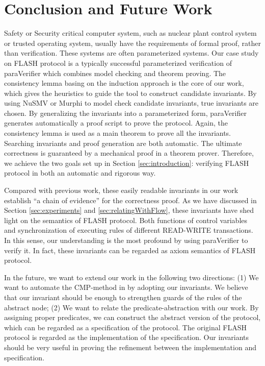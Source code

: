 \documentclass{llncs}
\newcommand{\bedt}[1]{{\color{black}#1}}
\begin{document}
\section{Conclusion and Future Work\label{sec:conclusion}}
\bedt{Safety or Security critical computer system, such as nuclear plant control system or trusted operating system, usually have the requirements of formal proof, rather than verification. These systems are often parameterized systems.} Our case study on FLASH protocol is a  typically successful \bedt{parameterized verification} of {\sf paraVerifier} which combines model checking and theorem proving. The consistency lemma basing on the induction approach is the
core of our work, which gives the heuristics to guide the tool
 to construct candidate invariants. By using NuSMV or Murphi to model check  candidate invariants, true invariants are  chosen.  By generalizing the invariants into a parameterized form, {\sf paraVerifier} generates automatically a proof script to  prove the protocol. Again, the consistency lemma is used as a main theorem to prove all the invariants. Searching invariants and proof generation are both automatic. The ultimate correctness is guaranteed by a mechanical proof in a theorem prover. Therefore, we \bedt{achieve} the two goals set up in Section \ref{sec:introduction}: verifying FLASH protocol in both an automatic and rigorous way.

 Compared with previous work, \bedt{these easily readable invariants in our work establish ``a chain of evidence'' for the correctness proof.} As we have discussed in Section \ref{sec:experiments} and \ref{sec:relatingWithFlow}, these invariants have shed light on the semantics of FLASH protocol. Both functions of control variables and synchronization of executing rules of different  READ-WRITE transactions. In this sense,  our understanding  is the most profound by using {\sf paraVerifier} to verify it. In fact, these invariants can be regarded as axiom semantics of FLASH protocol. %

 In the future, we want to extend our work in the following two directions: (1) We want to automate the CMP-method in \cite{Chou2004} by adopting our invariants. We believe that our invariant should be enough to strengthen   guards of the rules of the abstract node; (2) We want to relate the predicate-abstraction with our work. By assigning proper predicates, we can construct the abstract version of the protocol, which can be regarded as a specification of the protocol. The original FLASH protocol is regarded as the implementation of the specification. Our invariants should be very useful in proving the refinement between the implementation and specification.
\end{document}
